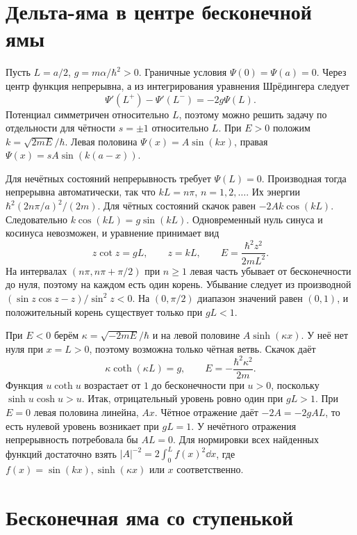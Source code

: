 \documentclass[11pt,a4paper]{article}
\begin{document}

\section{Дельта-яма в центре бесконечной ямы}

Пусть \(L=a/2\), \(g=m\alpha/\hbar^2>0\).
Граничные условия \(\Psi(0)=\Psi(a)=0\). Через центр функция
непрерывна, а из интегрирования уравнения Шрёдингера следует
\[
 \Psi'(L^+)-\Psi'(L^-)=-2g\Psi(L).
\]
Потенциал симметричен относительно \(L\), поэтому можно решить задачу
по отдельности для чётности \(s=\pm1\) относительно \(L\).
При \(E>0\) положим \(k=\sqrt{2mE}/\hbar\). Левая половина
\(\Psi(x)=A\sin(kx)\), правая \(\Psi(x)=sA\sin(k(a-x))\).

Для нечётных состояний непрерывность требует \(\Psi(L)=0\).
Производная тогда непрерывна автоматически, так что \(kL=n\pi\),
\(n=1,2,\ldots\). Их энергии \(\hbar^2(2n\pi/a)^2/(2m)\).
Для чётных состояний скачок равен \(-2Ak\cos(kL)\).
Следовательно \(k\cos(kL)=g\sin(kL)\). Одновременный нуль
синуса и косинуса невозможен, и уравнение принимает вид
\[
 z\cot z=gL,\qquad z=kL,\qquad E=\frac{\hbar^2 z^2}{2mL^2}.
\]
На интервалах \((n\pi,n\pi+\pi/2)\) при \(n\ge1\) левая часть
убывает от бесконечности до нуля, поэтому на каждом есть один корень.
Убывание следует из производной
\((\sin z\cos z-z)/\sin^2z<0\).
На \((0,\pi/2)\) диапазон значений равен \((0,1)\), и
положительный корень существует только при \(gL<1\).

При \(E<0\) берём \(\kappa=\sqrt{-2mE}/\hbar\) и на левой
половине \(A\sinh(\kappa x)\). У неё нет нуля при \(x=L>0\),
поэтому возможна только чётная ветвь. Скачок даёт
\[
 \kappa\coth(\kappa L)=g,\qquad E=-\frac{\hbar^2\kappa^2}{2m}.
\]
Функция \(u\coth u\) возрастает от \(1\) до бесконечности
при \(u>0\), поскольку \(\sinh u\cosh u>u\).
Итак, отрицательный уровень ровно один при \(gL>1\).
При \(E=0\) левая половина линейна, \(Ax\).
Чётное отражение даёт \(-2A=-2gAL\), то есть нулевой уровень
возникает при \(gL=1\). У нечётного отражения непрерывность
потребовала бы \(AL=0\). Для нормировки всех найденных функций
достаточно взять \(|A|^{-2}=2\int_0^L f(x)^2\dd x\),
где \(f(x)=\sin(kx),\sinh(\kappa x)\) или \(x\) соответственно.

\section{Бесконечная яма со ступенькой}
\end{document}
